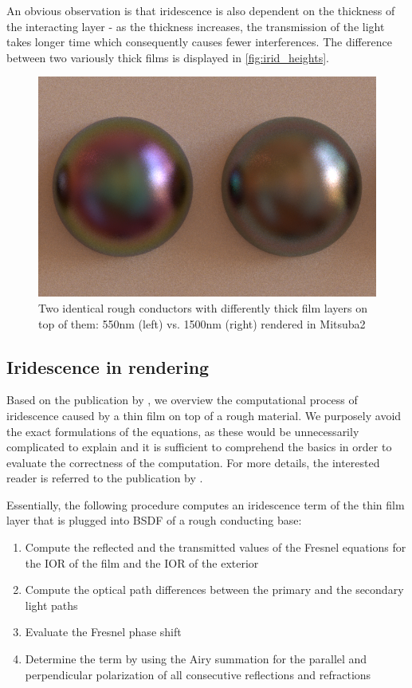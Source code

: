 An obvious observation is that iridescence is also dependent on the thickness of the interacting layer - as the thickness increases, the transmission of the light takes longer time which consequently causes fewer interferences. The difference between two variously thick films is displayed in \autoref{fig:irid_heights}.

\begin{figure}[h]
	\centering
	\includegraphics[width=.6\linewidth]{img/irid_heights.png}
	\caption{Two identical rough conductors with differently thick film layers on top of them: 550nm (left) vs. 1500nm (right) rendered in Mitsuba2}
	\label{fig:irid_heights}
\end{figure}

\subsection{Iridescence in rendering}

Based on the publication by \citet{belcour2017practical}, we overview the computational process of iridescence caused by a thin film on top of a rough material. We purposely avoid the exact formulations of the equations, as these would be unnecessarily complicated to explain and it is sufficient to comprehend the basics in order to evaluate the correctness of the computation. For more details, the interested reader is referred to the publication by \citet{belcour2017practical}.

Essentially, the following procedure computes an iridescence term of the thin film layer that is plugged into BSDF of a rough conducting base:

\begin{enumerate}
	\item Compute the reflected and the transmitted values of the Fresnel equations for the IOR of the film and the IOR of the exterior
	\item Compute the optical path differences between the primary and the secondary light paths
	\item Evaluate the Fresnel phase shift
	\item Determine the term by using the Airy summation for the parallel and perpendicular polarization of all consecutive reflections and refractions
\end{enumerate}

